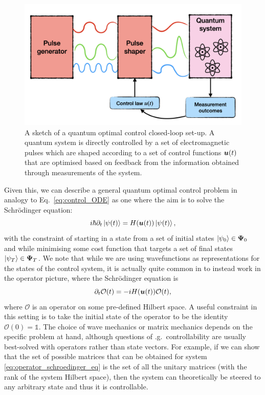 \begin{figure}[t]
\centering
\includegraphics[width=0.8\linewidth]{images/optimal_control_placeholder.png} \caption[Schematic diagram of open-loop quantum optimal control]{A sketch of a quantum optimal control closed-loop set-up. A quantum system is directly controlled by a set of electromagnetic pulses which are shaped according to a set of control functions $\boldsymbol{u}(t)$ that are optimised based on feedback from the information obtained through measurements of the system.}\label{fig:quantum_optimal_control}
\end{figure}

Given this, we can describe a general quantum optimal control problem in analogy to Eq.~\eqref{eq:control_ODE} as one where the aim is to solve the Schr\"{o}dinger equation:
\begin{equation}\label{eq:optimal_control_schroedinger}
    i \hbar \partial_t \ket{\psi(t)} = H(\boldsymbol{u}(t))\ket{\psi(t)},
\end{equation}
with the constraint of starting in a state from a set of initial states $\ket{\psi_0} \in \boldsymbol \Psi_0$ and while minimising some cost function that targets a set of final states $\ket{\psi_T} \in \boldsymbol \Psi_T$. We note that while we are using wavefunctions as representations for the states of the control system, it is actually quite common in  to instead work in the operator picture, where the Schr\"{o}dinger equation is
\begin{equation}\label{eq:operator_schroedinger_eq}
    \partial_t \mathcal{O}(t) = -i H(\boldsymbol{u}(t))\mathcal{O}(t),
\end{equation}
where $\mathcal{O}$ is an operator on some pre-defined Hilbert space. A useful constraint in this setting is to take the initial state of the operator to be the identity $\mathcal{O}(0) = \mathds{1}$. The choice of wave mechanics or matrix mechanics depends on the specific  problem at hand, although questions of \@e.g.~controllability are usually best-solved with operators rather than state vectors. For example, if we can show that the set of possible matrices that can be obtained for system \eqref{eq:operator_schroedinger_eq} is the set of all the unitary matrices (with the rank of the system Hilbert space), then the system can theoretically be steered to any arbitrary state and thus it is controllable.

